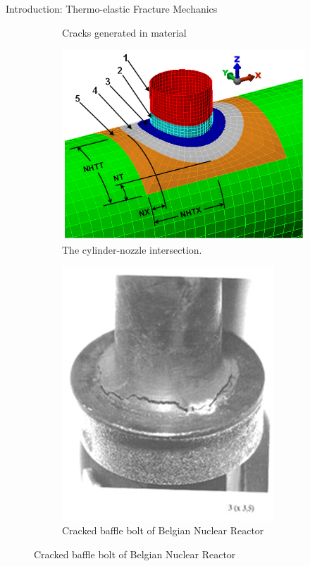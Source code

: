 \documentclass{beamer}
\begin{document}
\begin{frame}[t,fragile]{Introduction: Thermo-elastic Fracture Mechanics}
\begin{itemize}
\begin{figure}[H]
\begin{subfigure}{0.45\textwidth}
 \vspace{-.2cm}
 \caption{\tiny Cracks generated in material}
 \end{subfigure}
       \vspace{-.3cm}
      \begin{subfigure}{0.45\textwidth}
    \centering
    \includegraphics[scale=.1]{cyl.png}
 \vspace{-.2cm}
 \caption{\tiny{The cylinder-nozzle intersection.}}
 \label{cyl}
 \end{subfigure}
\begin{subfigure}{0.45\textwidth}
    \centering
    \includegraphics[scale=.1]{fail.jpg}
 \vspace{-.2cm}
 \caption{\tiny{Cracked baffle bolt of Belgian Nuclear Reactor}}

\end{subfigure}
\end{figure}
\end{itemize}
\end{frame}
\end{document}
